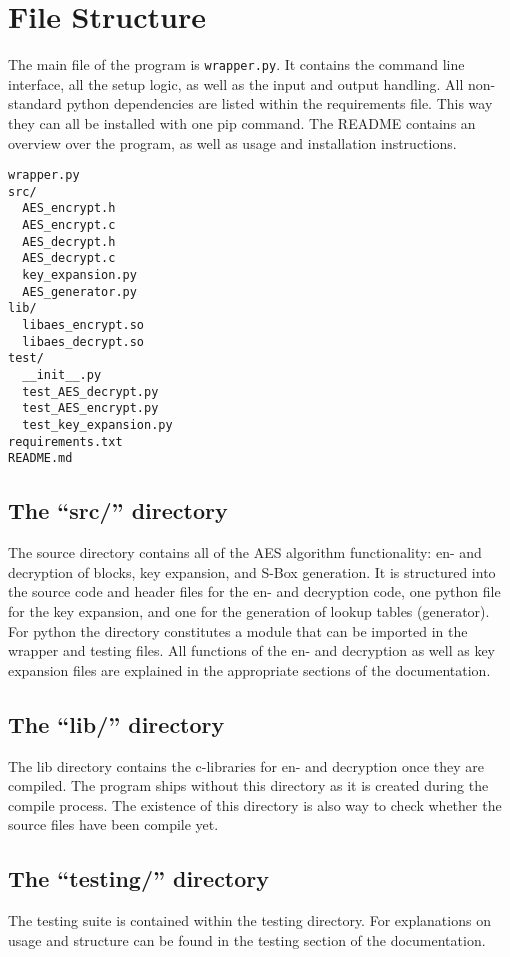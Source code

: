 \section{File Structure}
The main file of the program is \lstinline|wrapper.py|. It contains the command line interface, all the setup logic, as well as the input and output handling. All non-standard python dependencies are listed within the requirements file. This way they can all be installed with one pip command. The README contains an overview over the program, as well as usage and installation instructions.

\begin{lstlisting}
wrapper.py
src/
  AES_encrypt.h
  AES_encrypt.c
  AES_decrypt.h
  AES_decrypt.c
  key_expansion.py
  AES_generator.py
lib/
  libaes_encrypt.so
  libaes_decrypt.so
test/
  __init__.py
  test_AES_decrypt.py
  test_AES_encrypt.py
  test_key_expansion.py
requirements.txt
README.md
\end{lstlisting}


\subsection{The \enquote{src/} directory}
The source directory contains all of the AES algorithm functionality: en- and decryption of blocks, key expansion, and S-Box generation. It is structured into the source code and header files for the en- and decryption code, one python file for the key expansion, and one for the generation of lookup tables (generator). For python the directory constitutes a module that can be imported in the wrapper and testing files. All functions of the en- and decryption as well as key expansion files are explained in the appropriate sections of the documentation.

\subsection{The \enquote{lib/} directory}
The lib directory contains the c-libraries for en- and decryption once they are compiled. The program ships without this directory as it is created during the compile process. The existence of this directory is also way to check whether the source files have been compile yet.

\subsection{The \enquote{testing/} directory}
The testing suite is contained within the testing directory. For explanations on usage and structure can be found in the testing section of the documentation.
